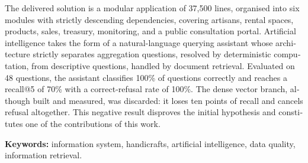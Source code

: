 \begin{otherlanguage}{english}
The delivered solution is a modular application of 37,500 lines, organised into six modules with strictly descending dependencies, covering artisans, rental spaces, products, sales, treasury, monitoring, and a public consultation portal. Artificial intelligence takes the form of a natural-language querying assistant whose architecture strictly separates aggregation questions, resolved by deterministic computation, from descriptive questions, handled by document retrieval. Evaluated on 48 questions, the assistant classifies 100\% of questions correctly and reaches a recall@5 of 70\% with a correct-refusal rate of 100\%. The dense vector branch, although built and measured, was discarded: it loses ten points of recall and cancels refusal altogether. This negative result disproves the initial hypothesis and constitutes one of the contributions of this work.

\vspace{0.6em}
\noindent\textbf{Keywords:} information system, handicrafts, artificial intelligence, data quality, information retrieval.
\end{otherlanguage}
\clearpage

